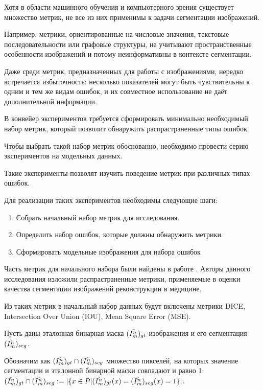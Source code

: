 Хотя в области машинного обучения и компьютерного зрения существует множество метрик, не все из них применимы к задачи сегментации изображений. 

Например, метрики, ориентированные на числовые значения, текстовые последовательности или графовые структуры, не учитывают пространственные особенности изображений и потому неинформативны в контексте сегментации.

Даже среди метрик, предназначенных для работы с изображениями, нередко встречается избыточность: несколько показателей могут быть чувствительны к одним и тем же видам ошибок, и их совместное использование не даёт дополнительной информации.

В конвейер экспериментов требуется сформировать минимально необходимый набор  метрик, который позволит обнаружить распрастраненные типы ошибок.

Чтобы выбрать такой набор метрик обоснованно, необходимо провести серию экспериментов на модельных данных.

Такие эксперименты позволят изучить поведение метрик при различных типах ошибок.

Для реализации таких экспериментов необходимы следующие шаги:

\begin{enumerate}
    \item Собрать начальный набор метрик для исследования.
    \item Определить набор ошибок, которые должны обнаружить метрики.
    \item Сформировать модельные изображения для набора ошибок
\end{enumerate}

Часть метрик для начального набора были найдены в работе \cite{taha2015metrics}. Авторы данного исследования изложили распрастраненные метрики, применяемые в оценки качества сегментации изображений реконструкции в медицине.

Из таких метрик в начальный набор данных будут включены метрики DICE, Intersection Over Union (IOU), Mean Square Error (MSE).

Пусть даны эталонная бинарная маска \((\tilde{I^n_m})_{gt}\) изображения и его сегментация \((\tilde{I^n_m})_{seg}\).

Обозначим как \((\tilde{I^n_m})_{gt} \cap (\tilde{I^n_m})_{seg}\) множество пикселей, на которых значение сегментации и эталонной бинарной маски совпадают и равно 1: \((\tilde{I^n_m})_{gt} \cap (\tilde{I^n_m})_{seg} := |\{x \in P | (\tilde{I^n_m})_{gt}(x) = (\tilde{I^n_m})_{seg}(x) = 1 \}|\).

